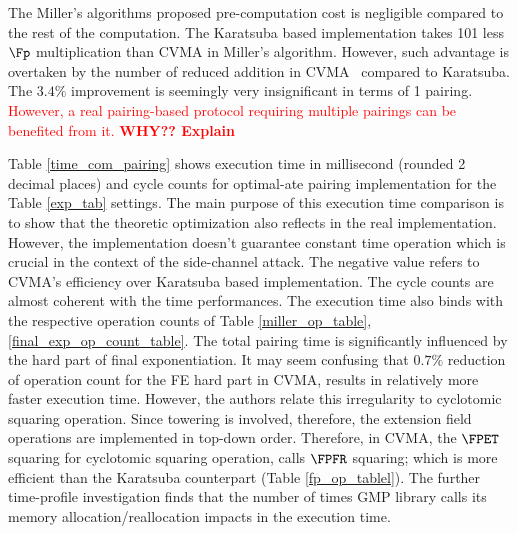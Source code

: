 The Miller's algorithms proposed pre-computation cost is negligible compared to the rest of the computation.
The Karatsuba based implementation takes 101 less $\Fp$ multiplication than CVMA in Miller's algorithm.
However, such advantage is overtaken by the number of reduced addition in CVMA~ compared to Karatsuba.
The $3.4\%$ improvement is seemingly very insignificant in terms of 1 pairing. 
 \textcolor{red}{However, a real pairing-based protocol requiring multiple pairings can be benefited from it. \textbf{WHY?? Explain}}

Table \ref{time_com_pairing} shows  execution time in millisecond (rounded 2 decimal places) and cycle counts for optimal-ate pairing implementation for the Table \ref{exp_tab} settings. 
The main purpose of this execution time comparison is to show that the theoretic optimization also reflects in the real implementation.
However, the implementation doesn't guarantee constant time operation which is crucial in the context of the side-channel attack.
The negative value refers to CVMA's efficiency over Karatsuba based implementation. 
The cycle counts are almost coherent with the time performances.
The execution time  also binds with the respective operation counts of Table \ref{miller_op_table}, \ref{final_exp_op_count_table}.
The total pairing time is significantly influenced by the hard part of final exponentiation. 
It may seem confusing that $0.7\%$ reduction of operation count for the FE hard part in CVMA, results in  relatively more faster execution time.
However, the authors relate this irregularity to cyclotomic squaring operation.
Since towering is involved, therefore, the extension field operations are implemented in top-down order.
Therefore, in CVMA, the $\FPET$ squaring for cyclotomic squaring operation, calls $\FPFR$ squaring; which is more efficient than the Karatsuba counterpart (Table \ref{fp_op_tablel}).
The further time-profile investigation finds that  the number of times GMP library calls its  memory allocation/reallocation impacts in the execution time.

